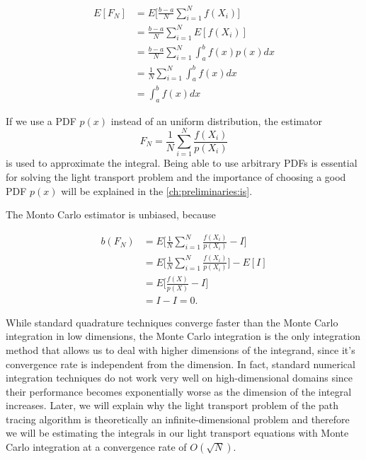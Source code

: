 \begin{equation}
\begin{split}
E[F_N] &= E\Bigg[\frac{b-a}{N}\sum_{i = 1}^{N}f(X_i)\Bigg] \\
&= \frac{b-a}{N}\sum_{i = 1}^{N}E[f(X_i)] \\
&= \frac{b-a}{N}\sum_{i = 1}^{N}\int_{a}^{b}f(x)p(x)dx \\
&= \frac{1}{N}\sum_{i = 1}^{N}\int_{a}^{b}f(x)dx \\
&= \int_{a}^{b}f(x)dx
\end{split}
\end{equation}
 
If we use a PDF $p(x)$ instead of an uniform distribution, the estimator
\begin{equation}
F_N = \frac{1}{N}\sum_{i = 1}^{N}\frac{f(X_i)}{p(X_i)}
\end{equation} 
is used to approximate the integral. Being able to use arbitrary PDFs is essential for solving the light transport problem and the importance of choosing a good PDF $p(x)$ will be explained in the \ref{ch:preliminaries:is}.

The Monto Carlo estimator is unbiased, because

\begin{equation}
\begin{split}
b(F_N) &= E\Bigg[\frac{1}{N}\sum_{i = 1}^{N}\frac{f(X_i)}{p(X_i)} - I\Bigg] \\
&= E\Bigg[\frac{1}{N}\sum_{i = 1}^{N}\frac{f(X_i)}{p(X_i)}\Bigg] - E[I] \\
&= E\Bigg[\frac{f(X)}{p(X)} - I\Bigg] \\
&= I - I = 0.
\end{split}
\end{equation}

While standard quadrature techniques converge faster than the Monte Carlo integration in low dimensions, the Monte Carlo integration is the only integration method that allows us to deal with higher dimensions of the integrand, since it's convergence rate is independent from the dimension. In fact, standard numerical integration techniques do not work very well on high-dimensional domains since their performance becomes exponentially worse as the dimension of the integral increases. Later, we will explain why the light transport problem of the path tracing algorithm is theoretically an infinite-dimensional problem and therefore we will be estimating the integrals in our light transport equations with Monte Carlo integration at a convergence rate of $O(\sqrt{N})$. \cite{RMCM}


